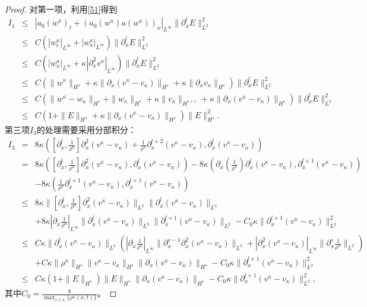 \begin{proof}
对第一项，利用\eqref{51}得到
\begin{eqnarray*}
  I_1 &\le&  |a_0(w^\kappa)_t + (a_0(w^\kappa) a(w^\kappa))_x|_{L^\infty} \|\partial^l_x E\|_{L^2}^2 \nonumber\\
      &\le& C (|w^\kappa_t|_{L^\infty} + |w^\kappa_x|_{L^\infty}) \|\partial^l_x E\|_{L^2}^2 \nonumber\\
      &\le& C (|w^\kappa_x|_{L^\infty} + \kappa |\partial^2_x v^\kappa|_{L^\infty}) \|\partial^l_x E\|_{L^2}^2 \nonumber\\
      &\le& C (\|w^\kappa\|_{H^s} + \kappa \|\partial_x(v^\kappa-v_\kappa)\|_{H^s} + \kappa \|\partial_x v_\kappa\|_{H^s} )\|\partial^l_x E\|_{L^2}^2 \nonumber\\
      &\le& C (\|w^\kappa-w_\kappa\|_{H^s}+\|w_\kappa\|_{H^s}+\kappa\|v_\kappa\|_{H^{s+1}} + \kappa \|\partial_x(v^\kappa-v_\kappa)\|_{H^s}) \|\partial^l_x E\|_{L^2}^2 \nonumber\\
      &\le& C (1+\|E\|_{H^s} + \kappa \|\partial_x (v^\kappa-v_\kappa)\|_{H^s}) \|E\|_{H^s}^2. \label{516}
\end{eqnarray*}
第三项$I_3$的处理需要采用分部积分：
\begin{eqnarray*}
  I_3 &=& 8 \kappa ([\partial^l_x,\frac{1}{\rho^\kappa}] \partial^2_x(v^\kappa-v_\kappa) + \frac{1}{\rho^\kappa} \partial^{l+2}_x(v^\kappa-v_\kappa),\partial^l_x (v^\kappa-v_\kappa) )\\
  &=& 8 \kappa ([\partial^l_x,\frac{1}{\rho^\kappa}] \partial^2_x(v^\kappa-v_\kappa),\partial^l_x (v^\kappa-v_\kappa))  -8 \kappa(\partial_x (\frac{1}{\rho^\kappa}) \partial^l_x(v^\kappa-v_\kappa),\partial^{l+1}_x (v^\kappa-v_\kappa)) \\ && -8\kappa ( \frac{1}{\rho^\kappa} \partial^{l+1}_x(v^\kappa-v_\kappa), \partial^{l+1}_x (v^\kappa-v_\kappa)) \\
  &\le& 8\kappa \|[\partial^l_x,\frac{1}{\rho^\kappa}]\partial^2_x(v^\kappa-v_\kappa)\|_{L^2} \|\partial^l_x (v^\kappa-v_\kappa)\|_{L^2} \\ & &+8\kappa |\partial_x \frac{1}{\rho^\kappa}|_{L^\infty} \|\partial^l_x (v^\kappa-v_\kappa)\|_{L^2} \|\partial^{l+1}_x(v^\kappa-v_\kappa)\|_{L^2}  -C_0 \kappa \|\partial^{l+1}_x (v^\kappa-v_\kappa)\|_{L^2}^2\\
  &\le& C\kappa \|\partial^l_x (v^\kappa-v_\kappa)\|_{L^2} (|\partial_x \frac{1}{\rho^\kappa}|_{L^\infty} \|\partial_x^{s-1} \partial^2_x(v^\kappa-v_\kappa)\|_{L^2} + |\partial^2_x (v^\kappa-v_\kappa)|_{L^\infty} \|\partial^s_x \frac{1}{\rho^\kappa}\|_{L^2})  \\ & & + C\kappa \|\rho^\kappa\|_{H^s} \|v^\kappa-v_\kappa\|_{H^s}\|\partial_x (v^\kappa-v_\kappa)\|_{H^s} -C_0 \kappa\|\partial^{l+1}_x (v^\kappa-v_\kappa)\|_{L^2}^2\\
  &\le& C\kappa (1+ \|E\|_{H^s})\|E\|_{H^s} \|\partial_x (v^\kappa-v_\kappa)\|_{H^s}-C_0 \kappa \|\partial^{l+1}_x (v^\kappa-v_\kappa)\|_{L^2}^2 ,
\end{eqnarray*}
其中$C_0 =\frac{ 8}{{\max_{x,t,\kappa} \{\rho^\kappa(x,t) \}}}$。


\end{proof}
